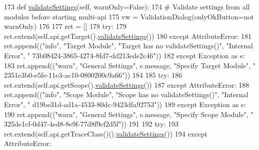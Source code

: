 \begin{DoxyCode}
173     \textcolor{keyword}{def }\hyperlink{classsoftware_1_1chipwhisperer_1_1capture_1_1ui_1_1CWCaptureGUI_1_1CWCaptureGUI_a30fb51f5239381a1b18e53b2c6e5b842}{validateSettings}(self, warnOnly=False):
174         \textcolor{comment}{# Validate settings from all modules before starting multi-api}
175         vw = ValidationDialog(onlyOkButton=\textcolor{keywordflow}{not} warnOnly)
176 
177         ret = []
178         \textcolor{keywordflow}{try}:
179             ret.extend(self.api.getTarget().\hyperlink{classsoftware_1_1chipwhisperer_1_1capture_1_1ui_1_1CWCaptureGUI_1_1CWCaptureGUI_a30fb51f5239381a1b18e53b2c6e5b842}{validateSettings}())
180         \textcolor{keywordflow}{except} AttributeError:
181             ret.append((\textcolor{stringliteral}{"info"}, \textcolor{stringliteral}{"Target Module"}, \textcolor{stringliteral}{"Target has no validateSettings()"}, \textcolor{stringliteral}{"Internal Error"}, \textcolor{stringliteral}{"
      73b08424-3865-4274-8fd7-dd213ede2c46"}))
182         \textcolor{keywordflow}{except} Exception \textcolor{keyword}{as} e:
183             ret.append((\textcolor{stringliteral}{"warn"}, \textcolor{stringliteral}{"General Settings"}, e.message, \textcolor{stringliteral}{"Specify Target Module"}, \textcolor{stringliteral}{"
      2351e3b0-e5fe-11e3-ac10-0800200c9a66"}))
184 
185         \textcolor{keywordflow}{try}:
186             ret.extend(self.api.getScope().\hyperlink{classsoftware_1_1chipwhisperer_1_1capture_1_1ui_1_1CWCaptureGUI_1_1CWCaptureGUI_a30fb51f5239381a1b18e53b2c6e5b842}{validateSettings}())
187         \textcolor{keywordflow}{except} AttributeError:
188             ret.append((\textcolor{stringliteral}{"info"}, \textcolor{stringliteral}{"Scope Module"}, \textcolor{stringliteral}{"Scope has no validateSettings()"}, \textcolor{stringliteral}{"Internal Error"}, \textcolor{stringliteral}{"
      d19be31d-ad1a-4533-80dc-9423dfa92753"}))
189         \textcolor{keywordflow}{except} Exception \textcolor{keyword}{as} e:
190             ret.append((\textcolor{stringliteral}{"warn"}, \textcolor{stringliteral}{"General Settings"}, e.message, \textcolor{stringliteral}{"Specify Scope Module"}, \textcolor{stringliteral}{"
      325de1cf-0d47-4ed8-8e9f-77d8f9cf2d5f"}))
191 
192         \textcolor{keywordflow}{try}:
193             ret.extend(self.api.getTraceClass()().\hyperlink{classsoftware_1_1chipwhisperer_1_1capture_1_1ui_1_1CWCaptureGUI_1_1CWCaptureGUI_a30fb51f5239381a1b18e53b2c6e5b842}{validateSettings}())
194         \textcolor{keywordflow}{except} AttributeError:

\end{DoxyCode}
